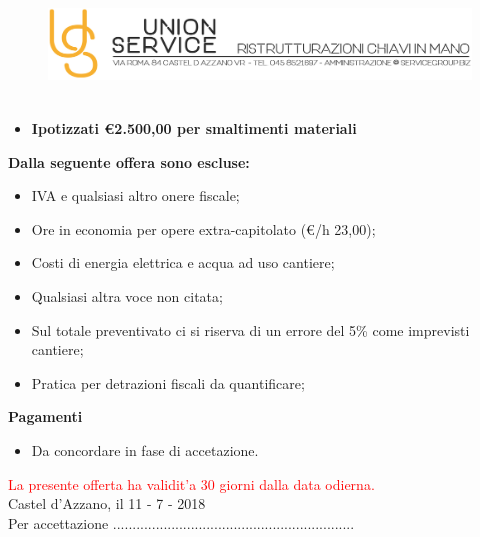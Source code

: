 \documentclass[a4paper]{article}
\begin{document}
                      \newpage

                      \begin{figure}[!t]
                      \includegraphics[width=15.8cm, height=3cm]{intestazioneAlta2.jpg}
                      \end{figure}

                      \begin{itemize}
                          \item \textbf{Ipotizzati \euro 2.500,00 per smaltimenti materiali}
                      \end{itemize}

                      \noindent\textbf{Dalla seguente offera sono escluse:}
                      \begin{itemize}
                          \item IVA e qualsiasi altro onere fiscale;
                          \item Ore in economia per opere extra-capitolato (\euro/h 23,00);
                          \item Costi di energia elettrica e acqua ad uso cantiere;
                          \item Qualsiasi altra voce non citata;
                          \item Sul totale preventivato ci si riserva di un errore del 5\% come imprevisti cantiere;
                          \item Pratica per detrazioni fiscali da quantificare;
                      \end{itemize}

                      \noindent\textbf{Pagamenti}
                      \begin{itemize}
                          \item Da concordare in fase di accetazione.
                      \end{itemize}

                      \textcolor{red}{La presente offerta ha validit'a 30 giorni dalla data odierna.}\\

                      Castel d'Azzano, il 11 - 7 - 2018
                      \vspace{1cm}\\
                      Per accettazione ..............................................................

                    
\end{document}
